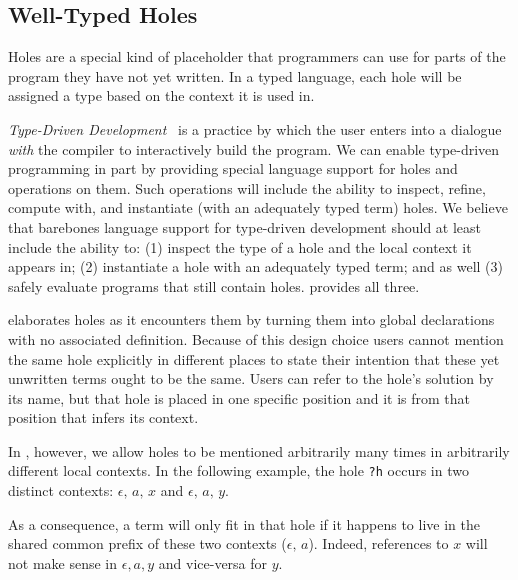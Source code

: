 \subsection{Well-Typed Holes}
\label{sec:design:holes}

Holes are a special kind of placeholder that programmers can use for parts of the program they have not yet written.
%
In a typed language, each hole will be assigned a type based on the context it is used in.

\emph{Type-Driven Development}~\cite{DBLP:journals/pacmpl/OmarVCH19}
is a practice by which the user enters into a dialogue
\emph{with} the compiler to interactively build the program.
%
We can enable type-driven programming in part by providing special language support for holes and operations on them.
Such operations will include the ability to inspect, refine, compute with, and instantiate (with an adequately typed term) holes.
%
We believe that barebones language support for type-driven development
should at least include the ability to:
%
(1) inspect the type of a hole and the local context it appears in;
%
(2) instantiate a hole with an adequately typed term;
%
and as well
%
(3) safely evaluate programs that still contain holes.
%
\Velo{} provides all three.

\Idris{} elaborates holes as it encounters them by turning them into
global declarations with no associated definition.
%
Because of this design choice users cannot mention the same hole explicitly in different places to state their intention that these yet unwritten terms ought to be the same.
%
Users can refer to the hole's solution by its name,
but that hole is placed in one specific position
and it is from that position that \Idris{} infers its context.

In \Velo{}, however, we allow holes to be mentioned arbitrarily many times in
arbitrarily different local contexts.
%
In the following example, the hole \texttt{?h} occurs in two distinct contexts:
$\epsilon,\,a,\,x$ and $\epsilon,\,a,\,y$.

\begin{center}
  \holeexamplegraph{}
\end{center}

As a consequence, a term will only fit in that hole if it happens to live in the shared common prefix of these two contexts ($\epsilon,\,a$).
%
Indeed, references to $x$ will not make sense in $\epsilon,a,y$ and vice-versa for $y$.


